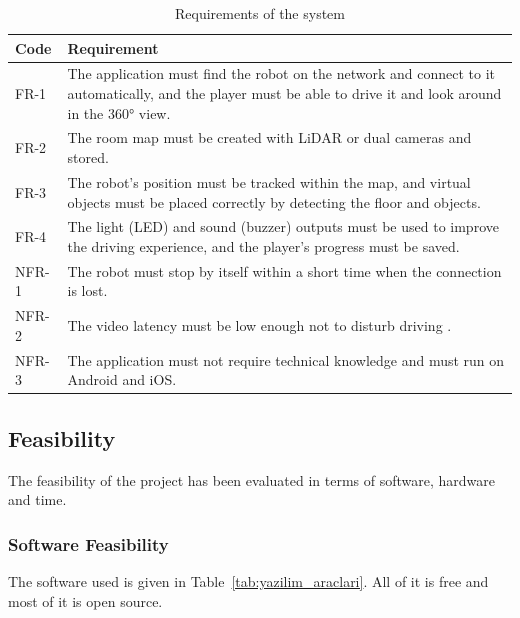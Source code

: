 \documentclass[11pt,a4paper]{article}
\begin{document}
\begin{table}[H]
\centering
\caption{Requirements of the system}
\label{tab:gereksinimler}
\small
\begin{tabularx}{\linewidth}{l >{\raggedright\arraybackslash}X}
\toprule
\textbf{Code} & \textbf{Requirement} \\
\midrule
FR-1 & The application must find the robot on the network and connect to it automatically, and the player must be able to drive it and look around in the 360° view. \\
FR-2 & The room map must be created with LiDAR or dual cameras and stored. \\
FR-3 & The robot's position must be tracked within the map, and virtual objects must be placed correctly by detecting the floor and objects. \\
FR-4 & The light (LED) and sound (buzzer) outputs must be used to improve the driving experience, and the player's progress must be saved. \\
NFR-1 & The robot must stop by itself within a short time when the connection is lost. \\
NFR-2 & The video latency must be low enough not to disturb driving \cite{tang2026lowlatency}. \\
NFR-3 & The application must not require technical knowledge and must run on Android and iOS. \\
\bottomrule
\end{tabularx}
\end{table}

\subsection{Feasibility}
\label{subsec:fizibilite}
The feasibility of the project has been evaluated in terms of software, hardware and time.

\subsubsection{Software Feasibility}
\label{subsubsec:yazilim_fizibilitesi}
The software used is given in Table~\ref{tab:yazilim_araclari}. All of it is free and most of it is open source.
\end{document}
